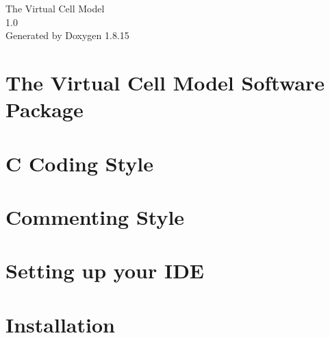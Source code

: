 \let\mypdfximage\pdfximage\def\pdfximage{\immediate\mypdfximage}\documentclass[twoside]{book}
\newcommand{\+}{\discretionary{\mbox{\scriptsize$\hookleftarrow$}}{}{}}
\newcommand{\clearemptydoublepage}{%
  \newpage{\pagestyle{empty}\cleardoublepage}%
}
\begin{document}
\hypersetup{pageanchor=false,
             bookmarksnumbered=true,
             pdfencoding=unicode
            }
\begin{titlepage}
\vspace*{7cm}
\begin{center}%
{\Large The Virtual Cell Model \\[1ex]\large 1.\+0 }\\
\vspace*{1cm}
{\large Generated by Doxygen 1.8.15}\\
\end{center}
\end{titlepage}
\clearemptydoublepage
{}
\tableofcontents
\clearemptydoublepage
{}
\hypersetup{pageanchor=true}

\chapter{The Virtual Cell Model Software Package}
\label{index}\hypertarget{index}{}
\chapter{C Coding Style}
\label{md__Users_sajjad_virtual_cell_Membrane_OBJ_documents_Doxygen_Coding_Style}

\chapter{Commenting Style}
\label{md__Users_sajjad_virtual_cell_Membrane_OBJ_documents_Doxygen_Commenting_Style}

\chapter{Setting up your I\+DE}
\label{md__Users_sajjad_virtual_cell_Membrane_OBJ_documents_Doxygen_IDE_Setup}

\chapter{Installation}
\label{Installation}

\end{document}

